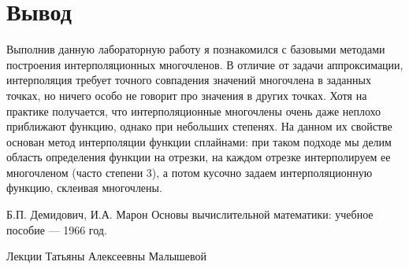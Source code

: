 \documentclass{article}
\begin{document}


\section{Вывод}

Выполнив данную лабораторную работу я познакомился
с базовыми методами построения интерполяционных 
многочленов. В отличие от задачи аппроксимации, 
интерполяция требует точного совпадения значений
многочлена в заданных точках, но ничего особо не 
говорит про значения в других точках. Хотя
на практике получается, что интерполяционные 
многочлены очень даже неплохо приближают функцию,
однако при небольших степенях. На данном их свойстве
основан метод интерполяции функции сплайнами: 
при таком подходе мы делим область определения 
функции на отрезки, на каждом отрезке интерполируем
ее многочленом (часто степени 3), а потом кусочно
задаем интерполяционную функцию, склеивая многочлены.

\begin{thebibliography}{9}

    Б.П. Демидович, И.А. Марон Основы вычислительной математики:
    учебное пособие — 1966 год.

    Лекции Татьяны Алексеевны Малышевой

\end{thebibliography}
\end{document}
